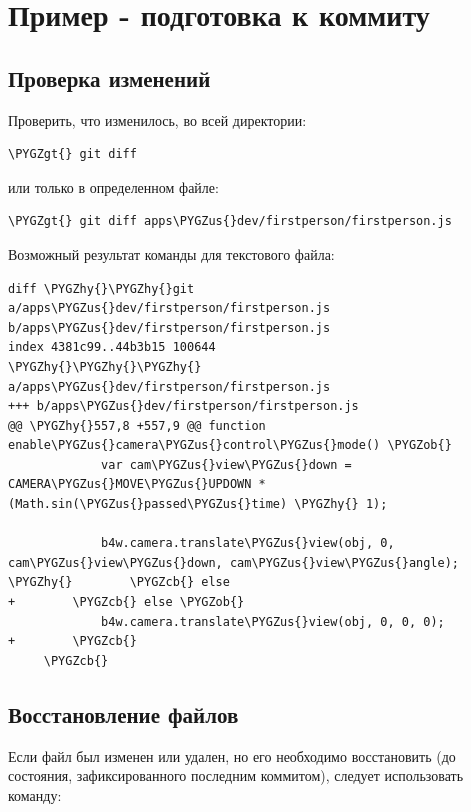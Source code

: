 \documentclass[a4paper,12pt,oneside]{sphinxmanual}
\def\PYGZus{\char`\_}
\def\PYGZob{\char`\{}
\def\PYGZcb{\char`\}}
\def\PYGZgt{\char`\>}
\def\PYGZhy{\char`\-}
\begin{document}

\section{Пример - подготовка к коммиту}
\label{git_short_manual:id5}\label{git_short_manual:git-example-prepare-to-commit}\label{git_short_manual:index-3}

\subsection{Проверка изменений}
\label{git_short_manual:id6}
Проверить, что изменилось, во всей директории:

\begin{Verbatim}[commandchars=\\\{\}]
\PYGZgt{} git diff
\end{Verbatim}

или только в определенном файле:

\begin{Verbatim}[commandchars=\\\{\}]
\PYGZgt{} git diff apps\PYGZus{}dev/firstperson/firstperson.js
\end{Verbatim}

Возможный результат команды  для текстового файла:

\begin{Verbatim}[commandchars=\\\{\}]
diff \PYGZhy{}\PYGZhy{}git a/apps\PYGZus{}dev/firstperson/firstperson.js b/apps\PYGZus{}dev/firstperson/firstperson.js
index 4381c99..44b3b15 100644
\PYGZhy{}\PYGZhy{}\PYGZhy{} a/apps\PYGZus{}dev/firstperson/firstperson.js
+++ b/apps\PYGZus{}dev/firstperson/firstperson.js
@@ \PYGZhy{}557,8 +557,9 @@ function enable\PYGZus{}camera\PYGZus{}control\PYGZus{}mode() \PYGZob{}
             var cam\PYGZus{}view\PYGZus{}down = CAMERA\PYGZus{}MOVE\PYGZus{}UPDOWN * (Math.sin(\PYGZus{}passed\PYGZus{}time) \PYGZhy{} 1);

             b4w.camera.translate\PYGZus{}view(obj, 0, cam\PYGZus{}view\PYGZus{}down, cam\PYGZus{}view\PYGZus{}angle);
\PYGZhy{}        \PYGZcb{} else
+        \PYGZcb{} else \PYGZob{}
             b4w.camera.translate\PYGZus{}view(obj, 0, 0, 0);
+        \PYGZcb{}
     \PYGZcb{}
\end{Verbatim}


\subsection{Восстановление файлов}
\label{git_short_manual:id7}
Если файл был изменен или удален, но его необходимо восстановить (до состояния, зафиксированного последним коммитом), следует использовать команду:
\end{document}
